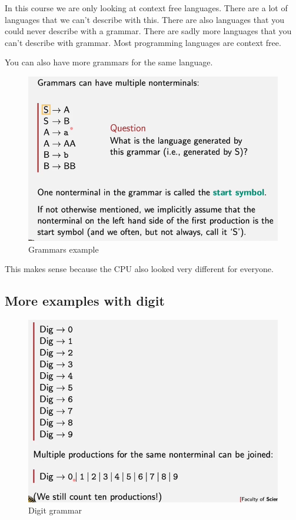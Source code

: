 \documentclass[
  11pt,
  british,
]{article}
\begin{document}
In this course we are only looking at context free languages. There are
a lot of languages that we can't describe with this. There are also
languages that you could never describe with a grammar. There are sadly
more languages that you can't describe with grammar. Most programming
languages are context free.

You can also have more grammars for the same language.

\begin{figure}
\centering
\includegraphics{Pasted_image_20211127131955.png}
\caption{Grammars example}
\end{figure}

This makes sense because the CPU also looked very different for
everyone.

\hypertarget{more-examples-with-digit}{%
\subsection{More examples with digit}\label{more-examples-with-digit}}

\begin{figure}
\centering
\includegraphics{Pasted_image_20211127132201.png}
\caption{Digit grammar}
\end{figure}
\end{document}
